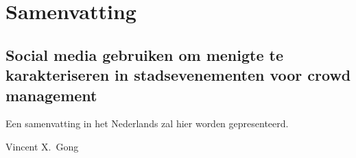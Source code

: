 \chapter*{Samenvatting}


\section*{Social media gebruiken om menigte te karakteriseren in stadsevenementen voor crowd management}

Een samenvatting in het Nederlands zal hier worden gepresenteerd.


\bigskip
\noindent Vincent X.\ Gong


